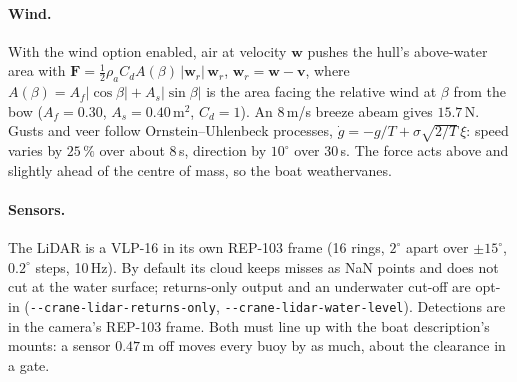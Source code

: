 \paragraph{Wind.} With the wind option enabled, air at velocity $\bm w$ pushes the hull's above-water area with
$\bm F = \tfrac12 \rho_a C_d A(\beta)\,|\bm w_r|\,\bm w_r$, $\bm w_r = \bm w - \bm v$,
where $A(\beta) = A_f|\cos\beta| + A_s|\sin\beta|$ is the area facing the relative
wind at $\beta$ from the bow ($A_f = 0.30$, $A_s = 0.40$\,m$^2$, $C_d = 1$). An
$8$\,m/s breeze abeam gives $15.7$\,N. Gusts and veer follow Ornstein--Uhlenbeck
processes, $\dot g = -g/T + \sigma\sqrt{2/T}\,\xi$: speed varies by $25\,\%$ over
about $8$\,s, direction by $10^\circ$ over $30$\,s. The force acts above and
slightly ahead of the centre of mass, so the boat weathervanes.

\paragraph{Sensors.} The LiDAR is a VLP-16 in its own REP-103 frame (16 rings,
$2^\circ$ apart over $\pm 15^\circ$, $0.2^\circ$ steps, 10\,Hz). By default its cloud
keeps misses as NaN points and does not cut at the water surface; returns-only
output and an underwater cut-off are opt-in (\texttt{-{}-crane-lidar-returns-only},
\texttt{-{}-crane-lidar-water-level}). Detections are in the camera's
REP-103 frame. Both must line up with the boat description's mounts: a sensor
$0.47$\,m off moves every buoy by as much, about the clearance in a gate.
